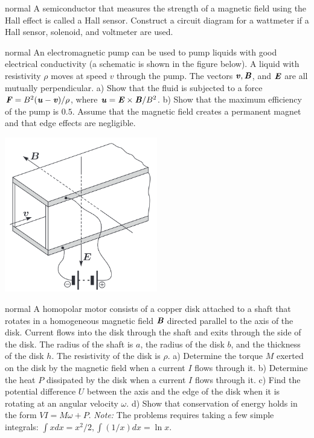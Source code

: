 \hypertarget{P173}{}
\begin{solution}{normal} %
A semiconductor that measures the strength of a magnetic field using the Hall effect is called a Hall sensor. Construct a circuit diagram for a wattmeter if a Hall sensor, solenoid, and voltmeter are used.
\end{solution}

\hypertarget{P174}{}
\begin{solution}{normal} %
An electromagnetic pump can be used to pump liquids with good electrical conductivity (a schematic is shown in the figure below). A liquid with resistivity $\rho$ moves at speed $v$ through the pump. The vectors $\textbf{\textit{v}},\textbf{\textit{B}}$, and $\textbf{\textit{E}}$ are all mutually perpendicular. a) Show that the fluid is subjected to a force $\textbf{\textit{F}}=B^2(\textbf{\textit{u}}-\textbf{\textit{v}})/\rho$, where $\textbf{\textit{u}}=\textbf{\textit{E}}\times\textbf{\textit{B}}/B^2$. b) Show that the maximum efficiency of the pump is $0.5$. Assume that the magnetic field creates a permanent magnet and that edge effects are negligible. 
\begin{center}
    \includegraphics[width=0.5\textwidth]{S7 Figures/S7-174.png}
\end{center}
\end{solution}

\hypertarget{P175}{}
\begin{solution}{normal} %
A homopolar motor consists of a copper disk attached to a shaft that rotates in a homogeneous magnetic field $\textbf{\textit{B}}$ directed parallel to the axis of the disk. Current flows into the disk through the shaft and exits through the side of the disk. The radius of the shaft is $a$, the radius of the disk $b$, and the thickness of the disk $h$. The resistivity of the disk is $\rho$. a) Determine the torque $M$ exerted on the disk by the magnetic field when a current $I$ flows through it. b) Determine the heat $P$ dissipated by the disk when a current $I$ flows through it. c) Find the potential difference $U$ between the axis and the edge of the disk when it is rotating at an angular velocity $\omega$. d) Show that conservation of energy holds in the form $VI=M\omega+P$. \textit{Note:} The problems requires taking a few simple integrals: $\int xdx=x^2/2,\int (1/x)dx=\ln x$.
\end{solution}